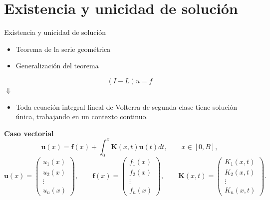 \documentclass{beamer}
\begin{document}
\section{Existencia y unicidad de solución}
\begin{frame}{Existencia y unicidad de solución}
\begin{itemize}
	\item Teorema de la serie geométrica
	\item Generalización del teorema\\
\end{itemize}
\vspace*{0.5cm}
\begin{equation*}
	(I-L)u = f
\end{equation*}
\vspace*{0.5cm}
\centering
$\Downarrow$
\vspace*{0.2cm}
\begin{itemize}
	\item Toda ecuación integral lineal de Volterra de segunda clase tiene solución única, trabajando en un contexto continuo.
\end{itemize}
\end{frame}
\begin{frame}
	\centering
	\textbf{Caso vectorial}
	\begin{equation*}
		\textbf{u}(x) = \textbf{f}(x) + \int_0^x \textbf{K}(x,t)\textbf{u}(t)dt, \qquad x \in [0,B],
	\end{equation*}
	\begin{equation*}
		\textbf{u}(x) = \begin{pmatrix}	u_1(x) \\ u_2(x) \\ \vdots \\ u_n(x)	\end{pmatrix}, \qquad \textbf{f}(x) = \begin{pmatrix}	f_1(x) \\ f_2(x) \\ \vdots \\ f_n(x)	\end{pmatrix}, \qquad \textbf{K}(x,t) = \begin{pmatrix}	K_1(x,t) \\ K_2(x,t) \\ \vdots \\ K_n(x,t)	\end{pmatrix}.
	\end{equation*}
\end{frame}
\end{document}
